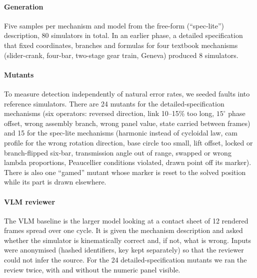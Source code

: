 \paragraph{Generation} Five samples per mechanism and model from the free-form (``spec-lite'') description, 80 simulators in total. In an earlier phase, a detailed specification that fixed coordinates, branches and formulas for four textbook mechanisms (slider-crank, four-bar, two-stage gear train, Geneva) produced 8 simulators.

\paragraph{Mutants} To measure detection independently of natural error rates, we seeded faults into reference simulators. There are 24 mutants for the detailed-specification mechanisms (six operators: reversed direction, link 10--15\% too long, $15^\circ$ phase offset, wrong assembly branch, wrong panel value, state carried between frames) and 15 for the spec-lite mechanisms (harmonic instead of cycloidal law, cam profile for the wrong rotation direction, base circle too small, lift offset, locked or branch-flipped six-bar, transmission angle out of range, swapped or wrong lambda proportions, Peaucellier conditions violated, drawn point off its marker). There is also one ``gamed'' mutant whose marker is reset to the solved position while its part is drawn elsewhere.

\paragraph{VLM reviewer} The VLM baseline is the larger model looking at a contact sheet of 12 rendered frames spread over one cycle. It is given the mechanism description and asked whether the simulator is kinematically correct and, if not, what is wrong. Inputs were anonymised (hashed identifiers, key kept separately) so that the reviewer could not infer the source. For the 24 detailed-specification mutants we ran the review twice, with and without the numeric panel visible.



